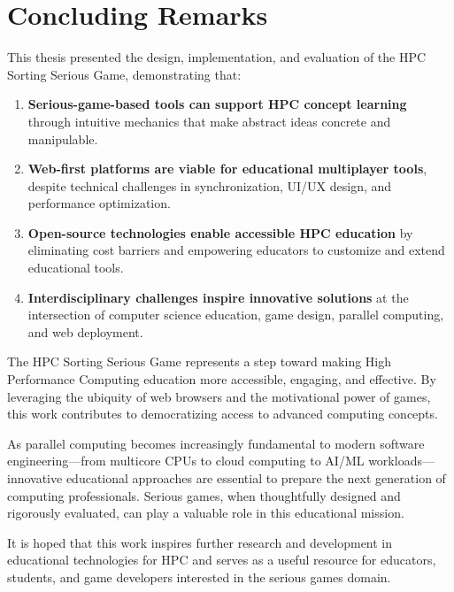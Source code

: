 \section{Concluding Remarks}
\label{sec:concluding-remarks}

This thesis presented the design, implementation, and evaluation of the HPC Sorting Serious Game, demonstrating that:

\begin{enumerate}
    \item \textbf{Serious-game-based tools can support HPC concept learning} through intuitive mechanics that make abstract ideas concrete and manipulable.

    \item \textbf{Web-first platforms are viable for educational multiplayer tools}, despite technical challenges in synchronization, UI/UX design, and performance optimization.

    \item \textbf{Open-source technologies enable accessible HPC education} by eliminating cost barriers and empowering educators to customize and extend educational tools.

    \item \textbf{Interdisciplinary challenges inspire innovative solutions} at the intersection of computer science education, game design, parallel computing, and web deployment.
\end{enumerate}

The HPC Sorting Serious Game represents a step toward making High Performance Computing education more accessible, engaging, and effective. By leveraging the ubiquity of web browsers and the motivational power of games, this work contributes to democratizing access to advanced computing concepts.

As parallel computing becomes increasingly fundamental to modern software engineering—from multicore CPUs to cloud computing to AI/ML workloads—innovative educational approaches are essential to prepare the next generation of computing professionals. Serious games, when thoughtfully designed and rigorously evaluated, can play a valuable role in this educational mission.

It is hoped that this work inspires further research and development in educational technologies for HPC and serves as a useful resource for educators, students, and game developers interested in the serious games domain.

